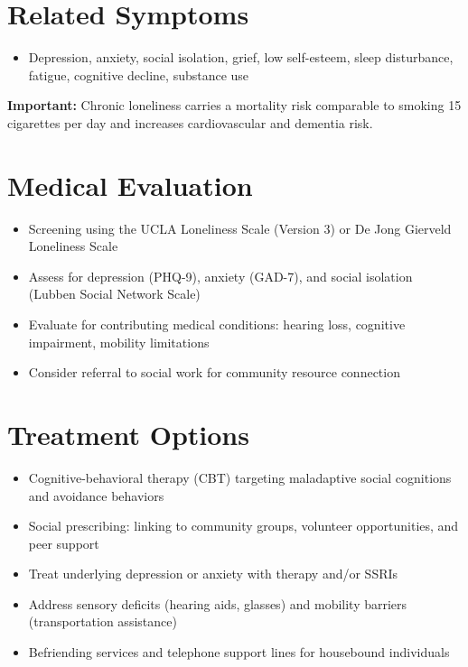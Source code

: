 \section*{Related Symptoms}
\begin{itemize}
  \item Depression, anxiety, social isolation, grief, low self-esteem, sleep disturbance, fatigue, cognitive decline, substance use
\end{itemize}
\textbf{Important:} Chronic loneliness carries a mortality risk comparable to smoking 15 cigarettes per day and increases cardiovascular and dementia risk.

\section*{Medical Evaluation}
\begin{itemize}
  \item Screening using the UCLA Loneliness Scale (Version 3) or De Jong Gierveld Loneliness Scale
  \item Assess for depression (PHQ-9), anxiety (GAD-7), and social isolation (Lubben Social Network Scale)
  \item Evaluate for contributing medical conditions: hearing loss, cognitive impairment, mobility limitations
  \item Consider referral to social work for community resource connection
\end{itemize}

\section*{Treatment Options}
\begin{itemize}
  \item Cognitive-behavioral therapy (CBT) targeting maladaptive social cognitions and avoidance behaviors
  \item Social prescribing: linking to community groups, volunteer opportunities, and peer support
  \item Treat underlying depression or anxiety with therapy and/or SSRIs
  \item Address sensory deficits (hearing aids, glasses) and mobility barriers (transportation assistance)
  \item Befriending services and telephone support lines for housebound individuals
\end{itemize}

